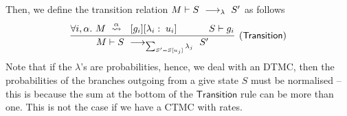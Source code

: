 Then, we define the transition relation $M\vdash S\ \longrightarrow_{\lambda}\ S'$ as
follows
$$
\infer[\mathsf{(Transition)}]
{
  M\vdash S\red{\sum_{S'= S[u_j]} \lambda_j}S'
}
{
  \forall i,\alpha.\ M\prismred{\alpha}\lab {g_i}{\lambda_i}{u_i}
  \quad&\quad
  S\vdash g_i
}
$$
Note that if the $\lambda$'s are probabilities, hence, we deal with an
DTMC, then the probabilities of the branches outgoing from a give
state $S$ must be normalised -- this is because the sum at the bottom
of the $\mathsf{Transition}$ rule can be more than one. This is not
the case if we have a CTMC with rates.


